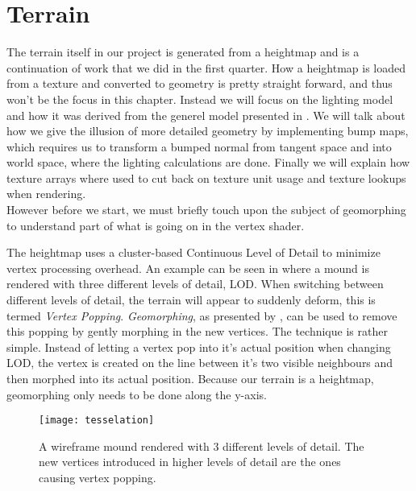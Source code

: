 \chapter{Terrain}


The terrain itself in our project is generated from a heightmap and is
a continuation of work that we did in the first quarter. How a
heightmap is loaded from a texture and converted to geometry is pretty
straight forward, and thus won't be the focus in this chapter. Instead
we will focus on the lighting model and how it was derived from the
generel model presented in . We will talk about how we
give the illusion of more detailed geometry by implementing bump maps,
which requires us to transform a bumped normal from tangent space and
into world space, where the lighting calculations are done. Finally we
will explain how texture arrays where used to cut back on texture unit
usage and texture lookups when rendering.\\


However before we start, we must briefly touch upon the subject of
geomorphing to understand part of what is going on in the vertex
shader.


The heightmap uses a cluster-based Continuous Level of Detail to
minimize vertex processing overhead. An example can be seen in
 where a mound is rendered with three
different levels of detail, LOD. When switching between different
levels of detail, the terrain will appear to suddenly deform, this is
termed \emph{Vertex Popping}. \emph{Geomorphing}, as presented by
, can be used to remove this popping by gently
morphing in the new vertices. The technique is rather simple. Instead
of letting a vertex pop into it's actual position when changing LOD,
the vertex is created on the line between it's two visible neighbours
and then morphed into its actual position. Because our terrain is a
heightmap, geomorphing only needs to be done along the y-axis.

\begin{figure}
  \label{fig:tesselation}
  \centering
  \texttt{[image: tesselation]}
  \caption{A wireframe mound rendered with 3 different levels of
    detail. The new vertices introduced in higher levels of detail are
    the ones causing vertex popping.}
\end{figure}

